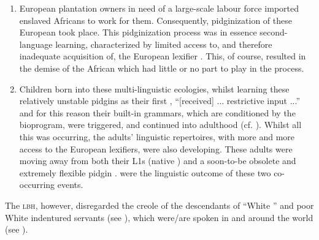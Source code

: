 \begin{enumerate}
\item European plantation owners in need of a large-scale labour force imported enslaved Africans to work for them. Consequently, pidginization of these European  took place. This pidginization process was in essence second-language learning, characterized by limited access to, and therefore inadequate acquisition of, the European lexifier  \citep{Bickerton77}. This, of course, resulted in the demise of the African  which had little or no part to play in the process.
\item Children born into these multi-linguistic ecologies, whilst learning these relatively unstable pidgins \citep[49]{Bickerton77}  as their first , ``[received] ... restrictive input ...'' and for this reason their  built-in grammars, which are conditioned by the bioprogram, were triggered, and continued into adulthood (cf. \citealt{Bickerton79, Bickerton84, Bickerton81}). Whilst all this was occurring, the adults' linguistic repertoires, with more and more access to the European lexifiers, were also developing. These adults were moving away from both their L1s (native ) and a soon-to-be obsolete and extremely flexible pidgin \citep{Bickerton81}.   were the linguistic outcome of these two co-occurring events.
\end{enumerate}

The \textsc{lbh}, however, disregarded the creole  of the descendants of ``White '' and poor White indentured servants (see \citealt{Schumann83, Cassidy82}), which were/are spoken in  and around the  world (see \citealt{Trudgill02}). 

